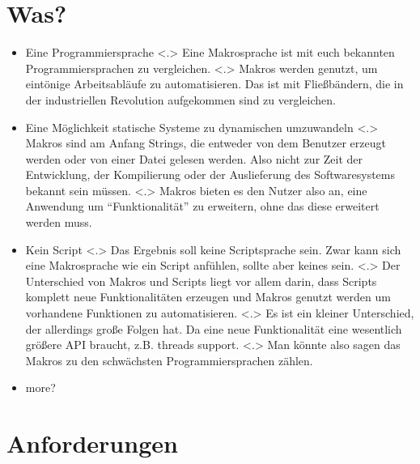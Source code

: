 \section{Was?}
  \begin{frame}
    \begin{itemize}[<+- | alert@+>]
      \item
        Eine Programmiersprache
            \note[item]<.>{
              Eine Makrosprache ist mit euch bekannten Programmiersprachen zu vergleichen.
            }
            \note[item]<.>{
              Makros werden genutzt, um eintönige Arbeitsabläufe zu automatisieren. Das ist mit Fließbändern, die in der industriellen Revolution aufgekommen sind zu vergleichen.
            }
      \item
        Eine Möglichkeit statische Systeme zu dynamischen umzuwandeln
            \note[item]<.>{
              Makros sind am Anfang Strings, die entweder von dem Benutzer erzeugt werden oder von einer Datei gelesen werden. Also nicht zur Zeit der Entwicklung, der Kompilierung oder der Auslieferung des Softwaresystems bekannt sein müssen.
            }
            \note[item]<.>{
              Makros bieten es den Nutzer also an, eine Anwendung um ``Funktionalität'' zu erweitern, ohne das diese erweitert werden muss.
            }
      \item Kein Script
            \note[item]<.>{
              Das Ergebnis soll keine Scriptsprache sein. Zwar kann sich eine Makrosprache wie ein Script anfühlen, sollte aber keines sein.
            }
            \note[item]<.>{
              Der Unterschied von Makros und Scripts liegt vor allem darin, dass Scripts komplett neue Funktionalitäten erzeugen und Makros genutzt werden um vorhandene Funktionen zu automatisieren.
            }
            \note[item]<.>{
              Es ist ein kleiner Unterschied, der allerdings große Folgen hat. Da eine neue Funktionalität eine wesentlich größere API braucht, z.B. threads support.
            }
            \note[item]<.>{
              Man könnte also sagen das Makros zu den schwächsten Programmiersprachen zählen.
            }
      \item \alert{\color{red} more?} %
    \end{itemize}
  \end{frame}

\section{Anforderungen}


